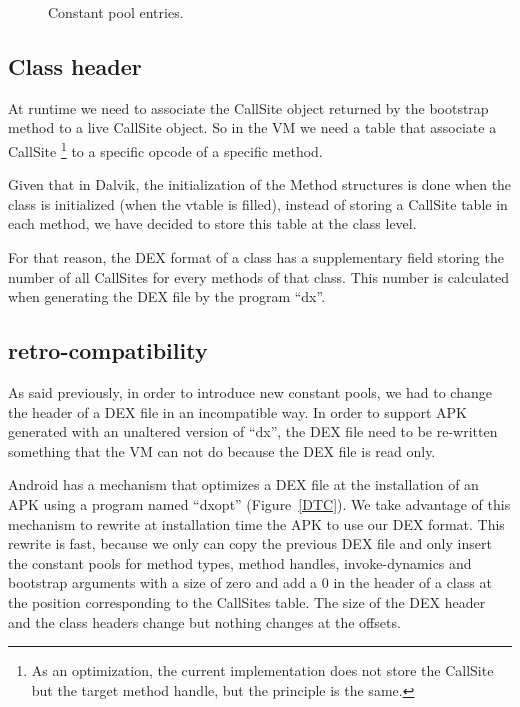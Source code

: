 \documentclass{sig-alternate}
\def \DALVIK{Dalvik\xspace}
\def \ANDROID{Android\xspace}
\begin{document}
    \begin{figure}[!ht]
      \centering 
      \centering 
      \centering 
      \centering \vspace{-1.5em}
      \caption{Constant pool entries.}
      \label{CPentries}
    \end{figure}

  \subsection{Class header}

    At runtime we need to associate the CallSite object returned by the bootstrap method
    to a live CallSite object. So in the VM we need a table that associate a CallSite
    \footnote{As an optimization, the current implementation does not store the CallSite
     but the target method handle, but the principle is the same.}
    to a specific opcode of a specific method.

    Given that in \DALVIK, the initialization of the Method structures is done when
    the class is initialized (when the vtable is filled), instead of storing a CallSite
    table in each method, we have decided to store this table at the class level.
    
    For that reason, the DEX format of a class has a supplementary field storing
    the number of all CallSites for every methods of that class. 
    This number is calculated when generating the DEX file by the program ``dx''.

  \subsection{retro-compatibility}
    \label{retro}

    As said previously, in order to introduce new constant pools, we had to change
    the header of a DEX file in an incompatible way.
    In order to support APK generated with an unaltered version of ``dx'',
    the DEX file need to be re-written something that the VM can not do
    because the DEX file is read only.

    \ANDROID has a mechanism that optimizes a DEX file at the installation of
    an APK using a program named ``dxopt'' (Figure~\ref{DTC}).
    We take advantage of this mechanism to rewrite at installation time the APK to use our DEX format.
    This rewrite is fast, because we only can copy the previous DEX file and only insert the
    constant pools for method types, method handles, invoke-dynamics and
    bootstrap arguments with a size of zero and add a 0 in the header of a class at the
    position corresponding to the CallSites table.
    The size of the DEX header and the class headers change but nothing changes at the offsets.
\end{document}
